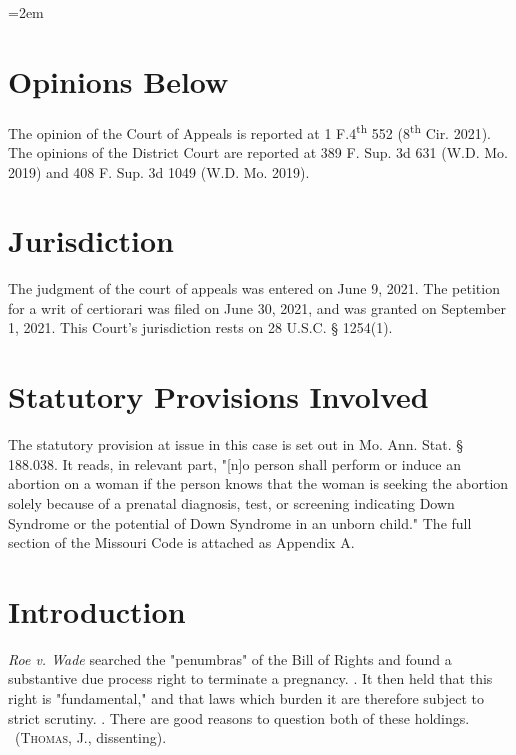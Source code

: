 \documentclass[12pt,\documentclassflag]{SCOTUS_Brief}
\author{Brendan Bernicker}
\begin{document}
\makefrontmatter

\parindent=2em
\setlength{\parskip}{1.25ex plus 2ex minus .5ex}

\section{Opinions Below}

The opinion of the Court of Appeals is reported at 1 F.4\textsuperscript{th} 552 (8\textsuperscript{th} Cir. 2021). The opinions of the District Court are reported at 389 F. Sup. 3d 631 (W.D. Mo. 2019) and 408 F. Sup. 3d 1049 (W.D. Mo. 2019).

\section{Jurisdiction}

The judgment of the court of appeals was entered on June 9, 2021. The petition for a writ of certiorari was filed on June 30, 2021, and was granted on September 1, 2021. This Court’s jurisdiction rests on 28 U.S.C. § 1254(1).

\section{Statutory Provisions Involved}

The statutory provision at issue in this case is set out in Mo. Ann. Stat. § 188.038. It reads, in relevant part, "[n]o person shall perform or induce an abortion on a woman if the person knows that the woman is seeking the abortion solely because of a prenatal diagnosis, test, or screening indicating Down Syndrome or the potential of Down Syndrome in an unborn child." The full section of the Missouri Code is attached as Appendix A.

\section{Introduction}

\textit{Roe v. Wade} searched the "penumbras" of the Bill of Rights and found a substantive due process right to terminate a pregnancy. . It then held that this right is "fundamental," and that laws which burden it are therefore subject to strict scrutiny. . There are good reasons to question both of these holdings. \Seeeg {}~(\textsc{Thomas}, J., dissenting).
\end{document}
